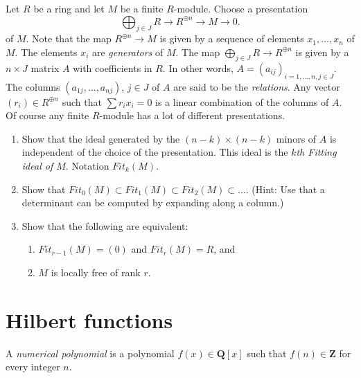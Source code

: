 \begin{exercise}
\label{exercise-fitting}
Let $R$ be a ring and let $M$ be a finite $R$-module.
Choose a presentation
$$
\bigoplus\nolimits_{j \in J} R \longrightarrow R^{\oplus n}
\longrightarrow M \longrightarrow 0.
$$
of $M$. Note that the map $R^{\oplus n} \to M$ is given by a sequence
of elements $x_1, \ldots, x_n$ of $M$. The elements $x_i$
are {\it generators} of $M$. The map $\bigoplus_{j \in J} R \to R^{\oplus n}$
is given by a $n \times J$ matrix $A$ with coefficients in $R$.
In other words, $A = (a_{ij})_{i = 1, \ldots, n, j \in J}$.
The columns $(a_{1j}, \ldots, a_{nj})$, $j \in J$ of $A$
are said to be the {\it relations}. Any vector $(r_i) \in R^{\oplus n}$
such that $\sum r_i x_i = 0$ is a linear combination of the columns of $A$.
Of course any finite $R$-module has a lot of different presentations.
\begin{enumerate}
\item Show that the ideal generated by the $(n - k) \times (n - k)$ minors of
$A$ is independent of the choice of the presentation.
This ideal is the {\it $k$th Fitting ideal of $M$}. Notation $Fit_k(M)$.
\item Show that
$Fit_0(M) \subset Fit_1(M) \subset Fit_2(M) \subset \ldots$.
(Hint: Use that a determinant can be computed by expanding along a column.)
\item Show that the following are equivalent:
\begin{enumerate}
\item $Fit_{r - 1}(M) = (0)$ and $Fit_r(M) = R$, and
\item $M$ is locally free of rank $r$.
\end{enumerate}
\end{enumerate}
\end{exercise}




\section{Hilbert functions}
\label{section-hilbert}

\begin{definition}
\label{definition-numerical-polynomial}
A {\it numerical polynomial} is a polynomial $f(x) \in {\mathbf Q}[x]$
such that $f(n) \in {\mathbf Z}$ for every integer $n$.
\end{definition}

